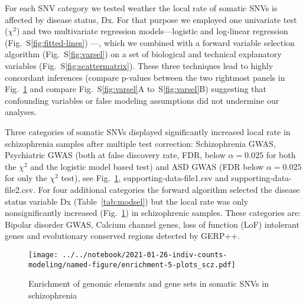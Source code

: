 \documentclass[letterpaper]{article}
\begin{document}
For each SNV category we tested weather the local rate of somatic SNVs is
affected by disease status, Dx.  For that purpose we employed one univariate test
($\chi^2$) and two multivariate regression models---logistic and log-linear
regression (Fig.~S\ref{fig:fitted-lines}) ---, which we combined with a forward
variable selection algorithm (Fig.~S\ref{fig:varsel}) on a set of biological
and technical explanatory variables (Fig.~S\ref{fig:scattermatrix}).  These three techniques
lead to highly concordant inferences (compare p-values between the two
rightmost panels in Fig.~\ref{fig:testresults} and compare
Fig.~S\ref{fig:varsel}A to~S\ref{fig:varsel}B) suggesting that confounding variables or false
modeling assumptions did not undermine our analyses.

Three categories of somatic SNVs displayed significantly increased local rate
in schizophrenia samples after multiple test correction: Schizophrenia GWAS,
Psychiatric GWAS (both at false discovery rate, FDR, below $\alpha=0.025$ for
both the $\chi^2$ and the logistic model based test) and ASD GWAS (FDR below
$\alpha=0.025$ for only the $\chi^2$ test), see Fig.~\ref{fig:testresults},
supporting-data-file1.csv and supporting-data-file2.csv.  For four
additional categories the forward algorithm selected the disease
status variable Dx (Table~\ref{tab:modsel}) but the local rate was
only nonsignificantly increased (Fig.~\ref{fig:testresults}) in
schizophrenic samples. These categories are: Bipolar disorder GWAS,
Calcium channel genes, loss of function (LoF) intolerant genes and
evolutionary conserved regions detected by GERP++.

\begin{figure}
\texttt{[image: ../../notebook/2021-01-26-indiv-counts-modeling/named-figure/enrichment-5-plots\_scz.pdf]}
\caption{Enrichment of genomic elements and gene sets in somatic SNVs in schizophrenia}
\label{fig:testresults}
\end{figure}
\end{document}
